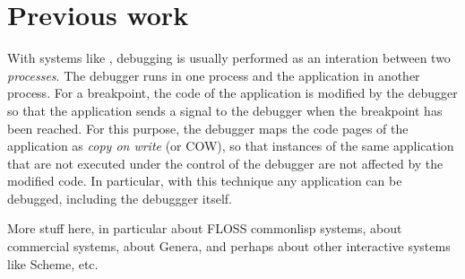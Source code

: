 \section{Previous work}

With systems like \unix{}, debugging is usually performed as an
interation between two \emph{processes}.  The debugger runs in one
process and the application in another process.  For a breakpoint, the
code of the application is modified by the debugger so that the
application sends a signal to the debugger when the breakpoint has
been reached.  For this purpose, the debugger maps the code pages of
the application as \emph{copy on write} (or COW), so that instances of
the same application that are not executed under the control of the
debugger are not affected by the modified code.  In particular, with
this technique any application can be debugged, including the
debuggger itself.

More stuff here, in particular about FLOSS commonlisp{} systems, about
commercial \commonlisp{} systems, about Genera, and perhaps about
other interactive systems like Scheme, etc.
